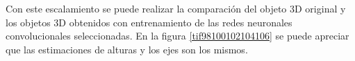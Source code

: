 \documentclass[10pt,letterpaper]{article}
\begin{document}
Con este escalamiento se puede realizar la comparación del objeto 3D original y los objetos 3D obtenidos con entrenamiento de las redes neuronales convolucionales seleccionadas. En la figura \ref{tif98100102104106} se puede apreciar que las estimaciones de alturas y los ejes son los mismos.

\begin{figure}[H]
      \begin{center}
\end{center}
\end{figure}
\end{document}
